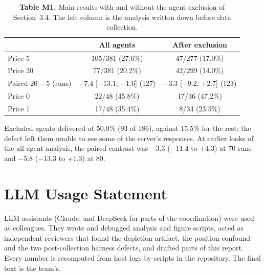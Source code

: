 \documentclass[11pt]{article}
\begin{document}
\begin{table}[htbp]
\centering
\small
\caption*{\textbf{Table M1.} Main results with and without the agent exclusion of Section~3.4. The
left column is the analysis written down before data collection.}
\begin{tabular}{lcc}
\toprule
& All agents & After exclusion \\
\midrule
Price 5 & 105/381 (27.6\%) & 47/277 (17.0\%) \\
Price 20 & 77/381 (20.2\%) & 42/299 (14.0\%) \\
Paired $20 - 5$ (runs) & $-7.4$ [$-13.1$, $-1.6$] (127) & $-3.3$ [$-9.2$, $+2.7$] (123) \\
Price 0 & 22/48 (45.8\%) & 17/36 (47.2\%) \\
Price 1 & 17/48 (35.4\%) & 8/34 (23.5\%) \\
\bottomrule
\end{tabular}
\end{table}

Excluded agents delivered at 50.0\% (93 of 186), against 15.5\% for the rest: the defect left them
unable to see some of the server's responses. At earlier
looks of the all-agent analysis, the paired contrast was $-3.3$ ($-11.4$ to $+4.3$) at 70 runs and
$-5.8$ ($-13.3$ to $+1.3$) at 80.

\section*{LLM Usage Statement}

LLM assistants (Claude, and DeepSeek for parts of the coordination) were used as colleagues. They wrote
and debugged analysis and figure scripts, acted as independent reviewers that found the depletion
artifact, the position confound and the two post-collection harness defects, and drafted parts of
this report. Every number is recomputed from host logs by scripts in the repository. The final text is
the team's.

\end{document}
